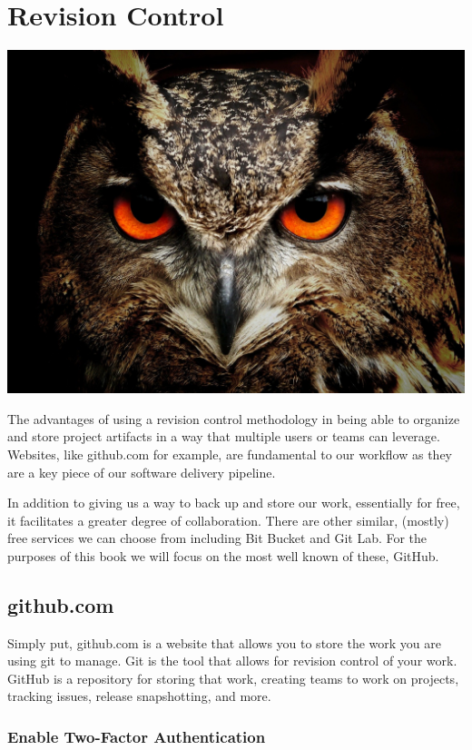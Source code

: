 \chapter{Revision Control}

\includegraphics[scale=0.20]{../images/owl-50267_1920.jpg}
\raggedbottom

\justify
The advantages of using a revision control methodology in being able to
organize and store project artifacts in a way that multiple users or
teams can leverage. Websites, like github.com for example, are
fundamental to our workflow as they are a key piece of our software
delivery pipeline.

\justify
In addition to giving us a way to back up and store our work,
essentially for free, it facilitates a greater degree of collaboration.
There are other similar, (mostly) free services we can choose from
including Bit Bucket and Git Lab. For the purposes of this book we will
focus on the most well known of these, GitHub.

\section{github.com}

Simply put, github.com is a website that allows you to store the work
you are using git to manage. Git is the tool that allows for revision
control of your work. GitHub is a repository for storing that work,
creating teams to work on projects, tracking issues, release
snapshotting, and more.

\subsection{Enable Two-Factor Authentication}

